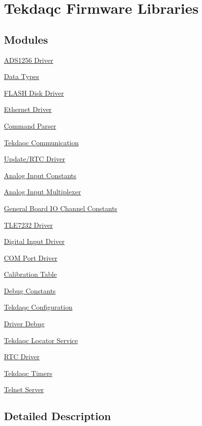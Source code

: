 \hypertarget{group__tekdaqc__firmware__libraries}{\section{Tekdaqc Firmware Libraries}
\label{group__tekdaqc__firmware__libraries}
}
\subsection*{Modules}
\begin{DoxyCompactItemize}
\item 
\hyperlink{group__ads1256__driver}{A\-D\-S1256 Driver}
\item 
\hyperlink{group__data__types}{Data Types}
\item 
\hyperlink{group__flash__disk__driver}{F\-L\-A\-S\-H Disk Driver}
\item 
\hyperlink{group__ethernet__driver}{Ethernet Driver}
\item 
\hyperlink{group__command__parser}{Command Parser}
\item 
\hyperlink{group__tekdaqc__communication}{Tekdaqc Communication}
\item 
\hyperlink{group__update__rtc__driver}{Update/\-R\-T\-C Driver}
\item 
\hyperlink{group__analog__input__constants}{Analog Input Constants}
\item 
\hyperlink{group__analog__input__multiplexer}{Analog Input Multiplexer}
\item 
\hyperlink{group__board__channel__constants}{General Board I\-O Channel Constants}
\item 
\hyperlink{group__tle7232__driver}{T\-L\-E7232 Driver}
\item 
\hyperlink{group__digital__input__driver}{Digital Input Driver}
\item 
\hyperlink{group__com__port__driver}{C\-O\-M Port Driver}
\item 
\hyperlink{group__calibration__table}{Calibration Table}
\item 
\hyperlink{group__debug__constants}{Debug Constants}
\item 
\hyperlink{group__tekdaqc__configuration}{Tekdaqc Configuration}
\item 
\hyperlink{group__driver__debug}{Driver Debug}
\item 
\hyperlink{group__tekdaqc__locator}{Tekdaqc Locator Service}
\item 
\hyperlink{group__rtc__driver}{R\-T\-C Driver}
\item 
\hyperlink{group__tekdaqc__timers}{Tekdaqc Timers}
\item 
\hyperlink{group__telnet__server}{Telnet Server}
\end{DoxyCompactItemize}


\subsection{Detailed Description}
